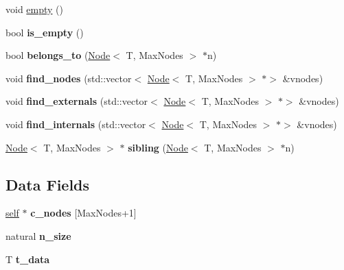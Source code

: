 \begin{DoxyCompactItemize}
\item 
void \hyperlink{classez_1_1objects_1_1Node_ae9b583e4373ecc7bf70ce30566c0817d}{empty} ()
\item 
\mbox{\label{classez_1_1objects_1_1Node_a0bd82219824d37ec094d7cd3fd51a09e}} 
bool {\bfseries is\+\_\+empty} ()
\item 
\mbox{\label{classez_1_1objects_1_1Node_a047820ffcfae5f9325f5201762713201}} 
bool {\bfseries belongs\+\_\+to} (\hyperlink{classez_1_1objects_1_1Node}{Node}$<$ T, Max\+Nodes $>$ $\ast$n)
\item 
\mbox{\label{classez_1_1objects_1_1Node_aac28009e2faeff0643f23a1898bf1c04}} 
void {\bfseries find\+\_\+nodes} (std\+::vector$<$ \hyperlink{classez_1_1objects_1_1Node}{Node}$<$ T, Max\+Nodes $>$ $\ast$$>$ \&vnodes)
\item 
\mbox{\label{classez_1_1objects_1_1Node_a4b61ad7d2fab6fea944092fa020478e4}} 
void {\bfseries find\+\_\+externals} (std\+::vector$<$ \hyperlink{classez_1_1objects_1_1Node}{Node}$<$ T, Max\+Nodes $>$ $\ast$$>$ \&vnodes)
\item 
\mbox{\label{classez_1_1objects_1_1Node_a73ef9591b20535196408e37de761a229}} 
void {\bfseries find\+\_\+internals} (std\+::vector$<$ \hyperlink{classez_1_1objects_1_1Node}{Node}$<$ T, Max\+Nodes $>$ $\ast$$>$ \&vnodes)
\item 
\mbox{\label{classez_1_1objects_1_1Node_a5307d05dca2b87d57472d43d62d629f6}} 
\hyperlink{classez_1_1objects_1_1Node}{Node}$<$ T, Max\+Nodes $>$ $\ast$ {\bfseries sibling} (\hyperlink{classez_1_1objects_1_1Node}{Node}$<$ T, Max\+Nodes $>$ $\ast$n)
\end{DoxyCompactItemize}
\subsection*{Data Fields}
\begin{DoxyCompactItemize}
\item 
\mbox{\label{classez_1_1objects_1_1Node_a55076daf3064fbe3b68e135d137791a2}} 
\hyperlink{classez_1_1objects_1_1Node}{self} $\ast$ {\bfseries c\+\_\+nodes} \mbox{[}Max\+Nodes+1\mbox{]}
\item 
\mbox{\label{classez_1_1objects_1_1Node_a5d8e7203a8b3b8a3a72274e8274e4b01}} 
natural {\bfseries n\+\_\+size}
\item 
\mbox{\label{classez_1_1objects_1_1Node_a349594bab99609ba0ad32d60242d1f43}} 
T {\bfseries t\+\_\+data}
\end{DoxyCompactItemize}
